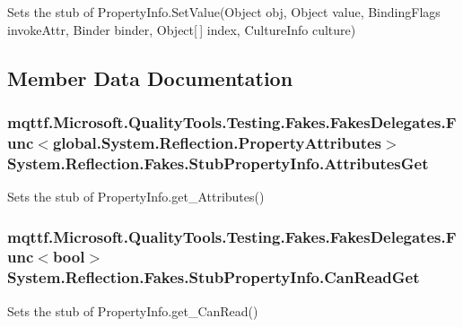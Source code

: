 Sets the stub of Property\-Info.\-Set\-Value(\-Object obj, Object value, Binding\-Flags invoke\-Attr, Binder binder, Object\mbox{[}$\,$\mbox{]} index, Culture\-Info culture)



\subsection{Member Data Documentation}
\hypertarget{class_system_1_1_reflection_1_1_fakes_1_1_stub_property_info_a2d31fec4273a1345d6137e4b1187ae50}{
\subsubsection[{Attributes\-Get}]{\setlength{\rightskip}{0pt plus 5cm}mqttf.\-Microsoft.\-Quality\-Tools.\-Testing.\-Fakes.\-Fakes\-Delegates.\-Func$<$global.\-System.\-Reflection.\-Property\-Attributes$>$ System.\-Reflection.\-Fakes.\-Stub\-Property\-Info.\-Attributes\-Get}}\label{class_system_1_1_reflection_1_1_fakes_1_1_stub_property_info_a2d31fec4273a1345d6137e4b1187ae50}


Sets the stub of Property\-Info.\-get\-\_\-\-Attributes()

\hypertarget{class_system_1_1_reflection_1_1_fakes_1_1_stub_property_info_aa3edc29dc9f728b41cdc871ca7819809}{
\subsubsection[{Can\-Read\-Get}]{\setlength{\rightskip}{0pt plus 5cm}mqttf.\-Microsoft.\-Quality\-Tools.\-Testing.\-Fakes.\-Fakes\-Delegates.\-Func$<$bool$>$ System.\-Reflection.\-Fakes.\-Stub\-Property\-Info.\-Can\-Read\-Get}}\label{class_system_1_1_reflection_1_1_fakes_1_1_stub_property_info_aa3edc29dc9f728b41cdc871ca7819809}


Sets the stub of Property\-Info.\-get\-\_\-\-Can\-Read()

